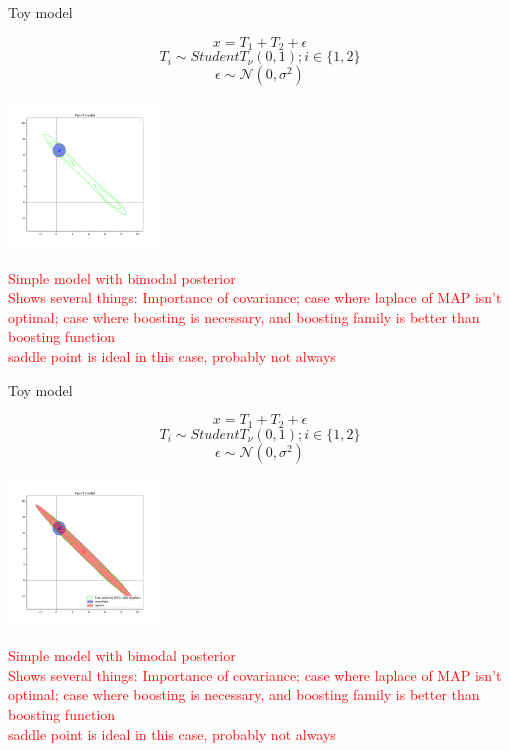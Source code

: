 \documentclass[
  ignorenonframetext,
]{beamer}
\begin{document}
\begin{frame}{Toy model}
\protect\hypertarget{toy-model-1}{}

\[x= T_1+T_2+\epsilon\] \[T_i\sim StudentT_{\nu}(0,1); i\in\{1,2\}\]
\[\epsilon\sim \mathcal{N}(0,\sigma^2)\]

\begin{center}\includegraphics[width=150px]{beforelaplace} \end{center}

\textcolor{red}{{\scriptsize Simple model with bimodal posterior\\Shows several things: Importance of covariance; case where laplace of MAP isn't optimal; case where boosting is necessary, and boosting family is better than boosting function\\saddle point is ideal in this case, probably not always}}

\end{frame}

\begin{frame}{Toy model}
\protect\hypertarget{toy-model-2}{}

\[x= T_1+T_2+\epsilon\] \[T_i\sim StudentT_{\nu}(0,1); i\in\{1,2\}\]
\[\epsilon\sim \mathcal{N}(0,\sigma^2)\]

\begin{center}\includegraphics[width=150px]{full} \end{center}

\textcolor{red}{{\scriptsize Simple model with bimodal posterior\\Shows several things: Importance of covariance; case where laplace of MAP isn't optimal; case where boosting is necessary, and boosting family is better than boosting function\\saddle point is ideal in this case, probably not always}}

\end{frame}
\end{document}
